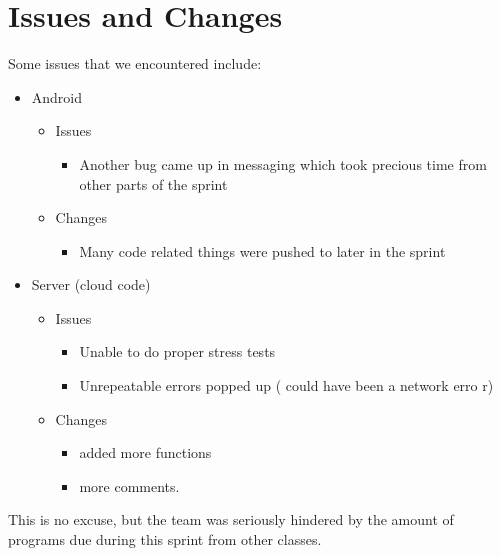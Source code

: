 \documentclass[11pt]{article}
\begin{document}
\section*{Issues and Changes}
Some issues that we encountered include:

	\begin{itemize}
		\item Android
			\begin{itemize}
				\item Issues
				\begin{itemize}
					\item Another bug came up in messaging which took precious time from other parts of the sprint
				\end{itemize}
				
				\item Changes
				\begin{itemize}
					\item Many code related things were pushed to later in the sprint
				\end{itemize}
			\end{itemize}
			
		\item Server (cloud code)
		\begin{itemize}
				\item Issues
				\begin{itemize}
					\item Unable to do proper stress tests
					\item Unrepeatable errors popped up ( could have been a network erro r)		
				\end{itemize}
				
				\item Changes 
				\begin{itemize}
					\item added more functions
					\item more comments.
				\end{itemize}
			\end{itemize}
	\end{itemize}
	This is no excuse, but the team was seriously hindered by the amount of programs due during this sprint from other classes.\\
\end{document}
